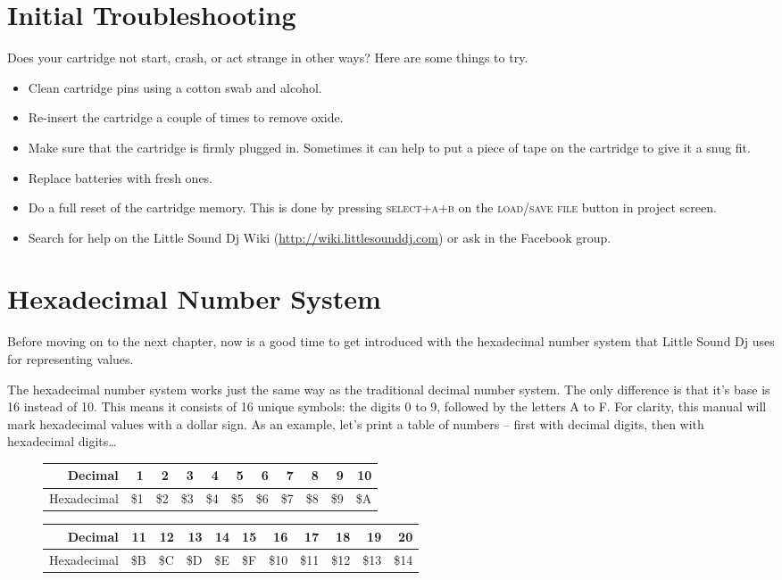 \section{Initial Troubleshooting}

Does your cartridge not start, crash, or act strange in other ways? Here are some things to try.

\begin{itemize}
\item Clean cartridge pins using a cotton swab and alcohol.
\item Re-insert the cartridge a couple of times to remove oxide.
\item Make sure that the cartridge is firmly plugged in. Sometimes it can help to put a piece of tape on the cartridge to give it a snug fit.
\item Replace batteries with fresh ones.
\item Do a full reset of the cartridge memory. This is done by pressing \textsc{select+a+b} on the \textsc{load/save file} button in project screen.
\item Search for help on the Little Sound Dj Wiki (\url{http://wiki.littlesounddj.com}) or ask in the Facebook group.
\end{itemize}

\section{Hexadecimal Number System}

Before moving on to the next chapter, now is a good time to get introduced with the hexadecimal number system that Little Sound Dj uses for representing values.

The hexadecimal number system works just the same way as the traditional decimal number system. The only difference is that it's base is 16 instead of 10. This means it consists of 16 unique symbols: the digits 0 to 9, followed by the letters A to F. For clarity, this manual will mark hexadecimal values with a dollar sign.
As an example, let's print a table of numbers -- first with decimal digits, then with
hexadecimal digits\ldots

\begin{figure}[hbtp]
\centering

\begin{tabular}{r|r|r|r|r|r|r|r|r|r|r}
 Decimal & 1 & 2 & 3 & 4 & 5 & 6 & 7 & 8 & 9 & 10 \\
\hline
 Hexadecimal & \$1 & \$2 & \$3 & \$4 & \$5 & \$6 & \$7 & \$8 & \$9 & \$A \\
\end{tabular}

\begin{tabular}{r|r|r|r|r|r|r|r|r|r|r}
 Decimal & 11 & 12 & 13 & 14 & 15 & 16 & 17 & 18 & 19 & 20 \\
\hline
 Hexadecimal & \$B & \$C & \$D & \$E & \$F & \$10 & \$11 & \$12 & \$13 & \$14  \\
\end{tabular}

\end{figure}

